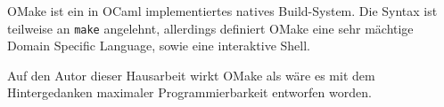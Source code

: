 OMake  ist ein in OCaml implementiertes natives
Build-System. Die Syntax ist teilweise an \texttt{make} angelehnt, allerdings
definiert OMake eine sehr mächtige Domain Specific Language, sowie eine
interaktive Shell.
%

Auf den Autor dieser Hausarbeit wirkt OMake als wäre es mit dem Hintergedanken
maximaler Programmierbarkeit entworfen worden.
